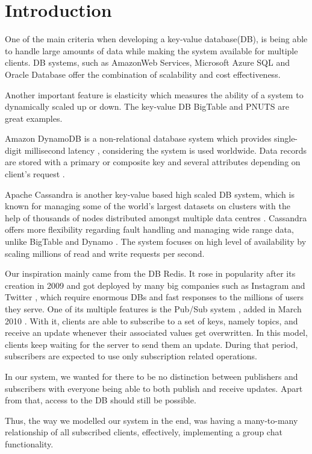 \section{Introduction}
\label{sec:introduction}
One of the main criteria when developing a key-value database(DB), is being able to handle large amounts of data while making the system available for multiple clients. DB systems, such as AmazonWeb Services, Microsoft Azure SQL and Oracle Database offer the combination of scalability and cost effectiveness.

Another important feature is elasticity which measures the ability of a system to dynamically scaled up or down. The key-value DB BigTable and PNUTS are great examples\cite{agrawal2011database}.

Amazon DynamoDB is a non-relational database system which provides single-digit millisecond latency \cite{amazon}, considering the system is used worldwide. Data records are stored with a primary or composite key and several attributes depending on client's request \cite{kalid2017big}. 

Apache Cassandra is another key-value based high scaled \cite{abadi2012consistency} DB system, which is known for managing some of the world's largest datasets on clusters with the help of thousands of nodes distributed amongst multiple data centres \cite{chebotko2015big}. Cassandra offers more flexibility regarding fault handling and managing wide range data, unlike BigTable and Dynamo \cite{kalid2017big}. The system focuses on high level of availability by scaling millions of read and write requests per second\cite{chebotko2015big}.

Our inspiration mainly came from the DB Redis. It rose in popularity after its creation in 2009 and got deployed by many big companies such as Instagram \cite{krieger2011instagram} and Twitter \cite{yu2014twitter}, which require enormous DBs and fast responses to the millions of users they serve. One of its multiple features is the Pub/Sub system \cite{redis2020pubsub}, added in March 2010 \cite{sanfilippo2010pubsub}. With it, clients are able to subscribe to a set of keys, namely topics, and receive an update whenever their associated values get overwritten. In this model, clients keep waiting for the server to send them an update. During that period, subscribers are expected to use only subscription related operations.

In our system, we wanted for there to be no distinction between publishers and subscribers with everyone being able to both publish and receive updates. Apart from that, access to the DB should still be possible. 

Thus, the way we modelled our system in the end, was having a many-to-many relationship of all subscribed clients, effectively, implementing a group chat functionality.


